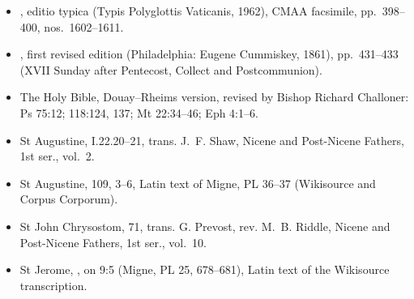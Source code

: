 {\footnotesize
\begin{itemize}\setlength{\itemsep}{0.15em}\setlength{\parskip}{0pt}
\item {}, editio typica (Typis Polyglottis Vaticanis, 1962), CMAA facsimile, pp.~398--400, nos.~1602--1611.
\item {}, first revised edition (Philadelphia: Eugene Cummiskey, 1861), pp.~431--433 (XVII Sunday after Pentecost, Collect and Postcommunion).
\item The Holy Bible, Douay--Rheims version, revised by Bishop Richard Challoner: Ps 75:12; 118:124, 137; Mt 22:34--46; Eph 4:1--6.
\item St Augustine,  I.22.20--21, trans. J.~F. Shaw, Nicene and Post-Nicene Fathers, 1st ser., vol.~2.
\item St Augustine,  109, 3--6, Latin text of Migne, PL 36--37 (Wikisource and Corpus Corporum).
\item St John Chrysostom,  71, trans. G. Prevost, rev. M.~B. Riddle, Nicene and Post-Nicene Fathers, 1st ser., vol.~10.
\item St Jerome, , on 9:5 (Migne, PL 25, 678--681), Latin text of the Wikisource transcription.
\end{itemize}
\par}

